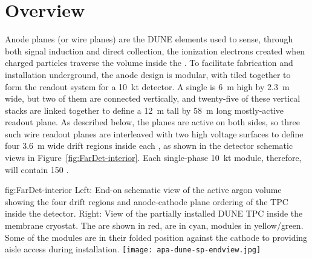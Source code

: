\section{Overview}
\label{sec:fdsp-apa-intro}

Anode planes (or wire planes) are the DUNE  elements used to sense, through both signal induction and direct collection, the ionization electrons created when charged particles traverse the \lar volume inside the . To facilitate fabrication and installation underground, the anode design is modular, with  tiled together to form the readout system for a \SI{10}{kt} detector. A single  is \SI{6}{m} high by \SI{2.3}{m} wide, but two of them are connected vertically, and twenty-five of these vertical stacks are linked together to define a \SI{12}{m} tall by \SI{58}{m} long mostly-active readout plane.  As described below, the planes are active on both sides, so three such wire readout planes are interleaved with two high voltage surfaces to define four \SI{3.6}{m} wide drift regions inside each , as shown in the detector schematic views in Figure~\ref{fig:FarDet-interior}.  Each single-phase \SI{10}{kt} module, therefore, will contain 150 .

\begin{dunefigure}{fig:FarDet-interior}
{Left: End-on schematic view of the active argon volume showing the four drift regions and anode-cathode plane ordering of the TPC inside the detector. Right: View of the partially installed DUNE TPC inside the membrane cryostat. The  are shown in red,  are in cyan,  modules in yellow/green.  Some of the  modules are in their folded position against the cathode to providing aisle access during installation.}
\setlength{\fboxsep}{0pt}
\setlength{\fboxrule}{0.5pt}
\texttt{[image: apa-dune-sp-endview.jpg]}\hspace{0.01\textwidth}
\end{dunefigure}

